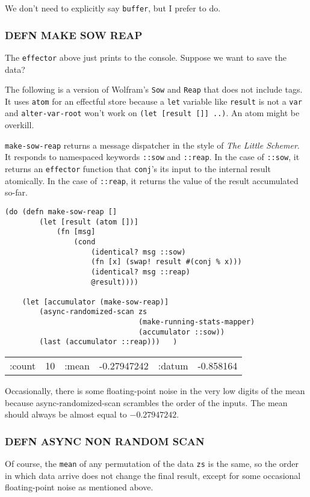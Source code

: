 \documentclass[10pt,oneside,x11names]{article}
\begin{document}
We don't need to explicitly say \texttt{buffer}, but I prefer to do.

\subsubsection{DEFN MAKE SOW REAP}
\label{sow-and-reap}
The \texttt{effector} above just prints to the console. Suppose we want to save
the data?

The following is a version of Wolfram's \texttt{Sow} and \texttt{Reap} that does not
include tags. It uses \texttt{atom} for an effectful store because a \texttt{let}
variable like \texttt{result} is not a \texttt{var} and \texttt{alter-var-root} won't work on
\texttt{(let [result []] ..)}. An atom might be overkill.

\texttt{make-sow-reap} returns a message dispatcher in the style of \emph{The Little
Schemer}. It responds to namespaced keywords \texttt{::sow} and \texttt{::reap}. In
the case of \texttt{::sow}, it returns an \texttt{effector} function that \texttt{conj}'s its
input to the internal result atomically. In the case of \texttt{::reap}, it
returns the value of the result accumulated so-far.

\begin{verbatim}
(do (defn make-sow-reap []
        (let [result (atom [])]
            (fn [msg]
                (cond
                    (identical? msg ::sow)
                    (fn [x] (swap! result #(conj % x)))
                    (identical? msg ::reap)
                    @result))))

    (let [accumulator (make-sow-reap)]
        (async-randomized-scan zs
                               (make-running-stats-mapper)
                               (accumulator ::sow))
        (last (accumulator ::reap)))   )
\end{verbatim}

\begin{center}
\begin{tabular}{lrlrlr}
:count & 10 & :mean & -0.27947242 & :datum & -0.858164\\
\end{tabular}
\end{center}

Occasionally, there is some floating-point noise in the very low digits
of the mean because async-randomized-scan scrambles the order of the
inputs. The mean should always be almost equal to \(-0.27947242\).

\subsubsection{DEFN ASYNC NON RANDOM SCAN}
\label{not-randomized}
Of course, the \texttt{mean} of any permutation of the data \texttt{zs} is the same,
so the order in which data arrive does not change the final result,
except for some occasional floating-point noise as mentioned above.
\end{document}
